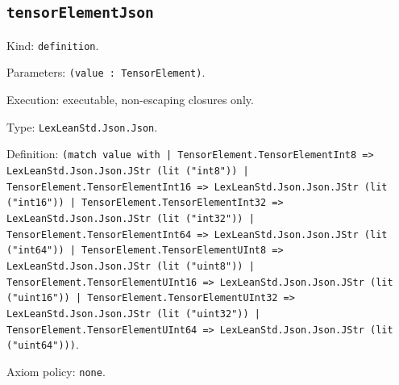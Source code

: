 \documentclass[11pt]{article}
\begin{document}
\subsection*{\texttt{tensorElementJson}}
\noindent Kind: \texttt{definition}.\par
\noindent Parameters: \texttt{(value : TensorElement)}.\par
\noindent Execution: executable, non-escaping closures only.\par
\noindent Type: \texttt{LexLeanStd.Json.Json}.\par
\noindent Definition: \texttt{(match value with | TensorElement.TensorElementInt8 => LexLeanStd.Json.Json.JStr (lit ("int8")) | TensorElement.TensorElementInt16 => LexLeanStd.Json.Json.JStr (lit ("int16")) | TensorElement.TensorElementInt32 => LexLeanStd.Json.Json.JStr (lit ("int32")) | TensorElement.TensorElementInt64 => LexLeanStd.Json.Json.JStr (lit ("int64")) | TensorElement.TensorElementUInt8 => LexLeanStd.Json.Json.JStr (lit ("uint8")) | TensorElement.TensorElementUInt16 => LexLeanStd.Json.Json.JStr (lit ("uint16")) | TensorElement.TensorElementUInt32 => LexLeanStd.Json.Json.JStr (lit ("uint32")) | TensorElement.TensorElementUInt64 => LexLeanStd.Json.Json.JStr (lit ("uint64")))}.\par
\noindent Axiom policy: \texttt{none}.\par
\end{document}
